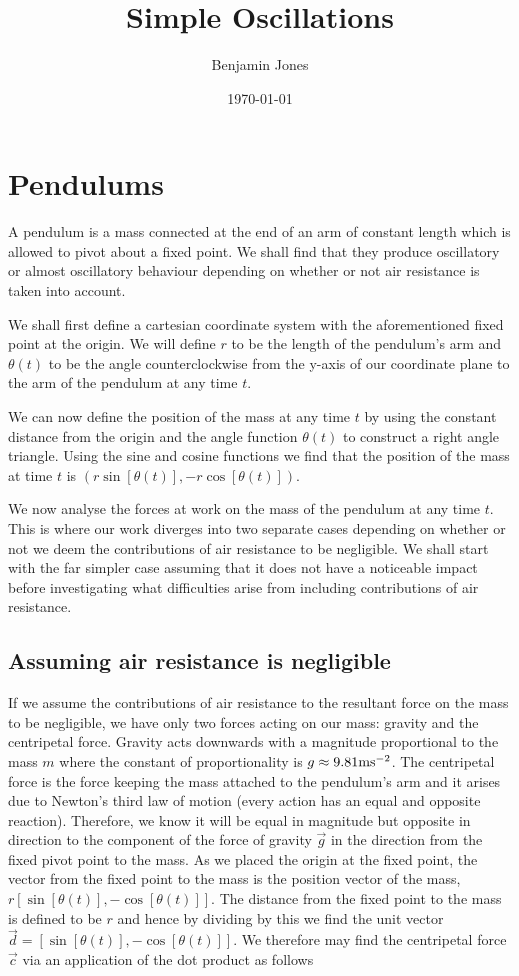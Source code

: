 \documentclass{article}
\title{Simple Oscillations}
\author{Benjamin Jones}
\date{\today}
\begin{document}
\maketitle
\newpage


\section{Pendulums}

A pendulum is a mass connected at the end of an arm of constant length which is allowed to pivot about a fixed point. We shall find that they produce oscillatory or almost oscillatory behaviour depending on whether or not air resistance is taken into account.

We shall first define a cartesian coordinate system with the aforementioned fixed point at the origin. We will define $r$ to be the length of the pendulum's arm and $\theta(t)$ to be the angle counterclockwise from the y-axis of our coordinate plane to the arm of the pendulum at any time $t$.

We can now define the position of the mass at any time $t$ by using the constant distance from the origin and the angle function $\theta(t)$ to construct a right angle triangle. Using the sine and cosine functions we find that the position of the mass at time $t$ is $(r\sin[\theta(t)], -r\cos[\theta(t)])$.

We now analyse the forces at work on the mass of the pendulum at any time $t$. This is where our work diverges into two separate cases depending on whether or not we deem the contributions of air resistance to be negligible. We shall start with the far simpler case assuming that it does not have a noticeable impact before investigating what difficulties arise from including contributions of air resistance.

\subsection{Assuming air resistance is negligible}

If we assume the contributions of air resistance to the resultant force on the mass to be negligible, we have only two forces acting on our mass: gravity and the centripetal force. Gravity acts downwards with a magnitude proportional to the mass $m$ where the constant of proportionality is $g \approx 9.81\textnormal{ms}^{-2}$. The centripetal force is the force keeping the mass attached to the pendulum's arm and it arises due to Newton's third law of motion (every action has an equal and opposite reaction). Therefore, we know it will be equal in magnitude but opposite in direction to the component of the force of gravity $\vec{g}$ in the direction from the fixed pivot point to the mass. As we placed the origin at the fixed point, the vector from the fixed point to the mass is the position vector of the mass, $r[\sin[\theta(t)], -\cos[\theta(t)]]$. The distance from the fixed point to the mass is defined to be $r$ and hence by dividing by this we find the unit vector $\vec{d} = [\sin[\theta(t)], -\cos[\theta(t)]]$. We therefore may find the centripetal force $\vec{c}$ via an application of the dot product as follows
\end{document}
